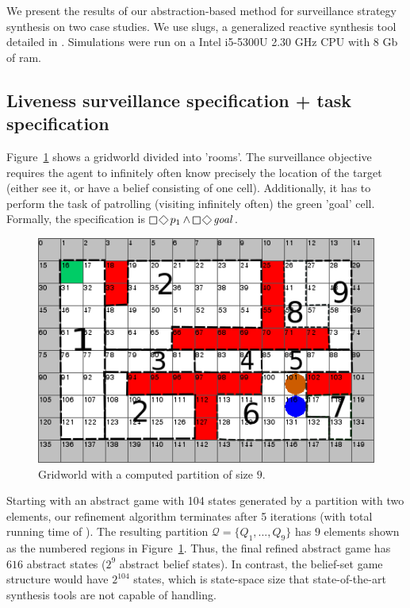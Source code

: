 We present the results of our abstraction-based method for surveillance strategy synthesis on two case studies. We use slugs, a generalized reactive synthesis tool detailed in \cite{EhlersR16}. Simulations were run on a Intel i5-5300U 2.30 GHz CPU with 8 Gb of ram. 

\subsection{Liveness surveillance specification + task specification}
Figure~\ref{fig:case1} shows a gridworld divided into  'rooms'. The surveillance objective requires the agent to infinitely often know precisely the location of the target (either see it, or have a belief consisting of one cell). Additionally, it has to perform the task of patrolling (visiting infinitely often) the green 'goal' cell. Formally, the specification is $\LTLglobally\LTLfinally p_1 \wedge \LTLglobally\LTLfinally \mathit{goal}$. 


\begin{figure}
\centering
\includegraphics[scale=0.4]{text970.png}\caption{Gridworld with a computed partition of size $9$.}\label{fig:case1}
\vspace{-.5cm}
\end{figure}


Starting with an abstract game with 104 states generated by a partition with two elements, our refinement algorithm terminates after 5 iterations (with total running time of ). The resulting partition $\mathcal{Q} = \{Q_1,...,Q_9 \}$ has $9$ elements shown as the numbered regions in Figure~\ref{fig:case1}. Thus, the final refined abstract game has $616$ abstract states ($2^9$ abstract belief states). In contrast, the belief-set game structure would have $2^{104}$ states, which is state-space size that state-of-the-art synthesis tools are not capable of handling.


